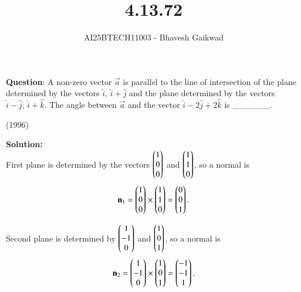\documentclass[journal]{IEEEtran}
\begin{document}

\vspace{3cm}

\title{4.13.72}
\author{AI25BTECH11003 - Bhavesh Gaikwad}
{\let\newpage\relax\maketitle}

\renewcommand{\thefigure}{\theenumi}
\renewcommand{\thetable}{\theenumi}
\setlength{\intextsep}{10pt} 


\renewcommand{\thetable}{\theenumi}


\textbf{Question}: 
A non-zero vector $\vec{a}$ is parallel to the line of intersection of the plane determined by the vectors $\hat{i}, \, \hat{i} + \hat{j}$ and the plane determined by the vectors $\hat{i} - \hat{j}, \, \hat{i} + \hat{k}$. The angle between $\vec{a}$ and the vector $\hat{i} - 2\hat{j} + 2\hat{k}$ is \_\_\_\_\_\_.

\hfill{(1996)}

\textbf{Solution:}\\

First plane is determined by the vectors $\begin{pmatrix}1 \\ 0 \\ 0\end{pmatrix}$ and $\begin{pmatrix}1 \\ 1 \\ 0\end{pmatrix}$, so a normal is
\begin{equation}
\mathbf{n}_1
= 
\begin{pmatrix}1 \\ 0 \\ 0\end{pmatrix} \times \begin{pmatrix}1 \\ 1 \\ 0\end{pmatrix}
=
\begin{pmatrix}0 \\ 0 \\ 1\end{pmatrix}.
\end{equation}


 Second plane is determined by $\begin{pmatrix}1 \\ -1 \\ 0\end{pmatrix}$ and $\begin{pmatrix}1 \\ 0 \\ 1\end{pmatrix}$, so a normal is
\begin{equation}
\mathbf{n}_2
=
\begin{pmatrix}1 \\ -1 \\ 0\end{pmatrix} \times \begin{pmatrix}1 \\ 0 \\ 1\end{pmatrix}
=
\begin{pmatrix}-1 \\ -1 \\ 1\end{pmatrix}.
\end{equation}
\end{document}
